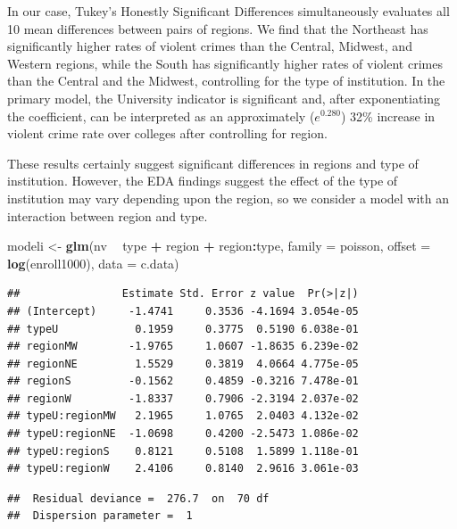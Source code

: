 \documentclass[
]{krantz}
\newenvironment{Shaded}{\begin{snugshade}}{\end{snugshade}}
\newcommand{\DataTypeTok}[1]{\textcolor[rgb]{0.27,0.27,0.27}{#1}}
\newcommand{\KeywordTok}[1]{\textcolor[rgb]{0.27,0.27,0.27}{\textbf{#1}}}
\newcommand{\NormalTok}[1]{#1}
\newcommand{\OperatorTok}[1]{\textcolor[rgb]{0.43,0.43,0.43}{\textbf{#1}}}
\newcommand{\StringTok}[1]{\textcolor[rgb]{0.5,0.5,0.5}{#1}}
\begin{document}
In our case, Tukey's Honestly Significant Differences simultaneously evaluates all 10 mean differences between pairs of regions. We find that the Northeast has significantly higher rates of violent crimes than the Central, Midwest, and Western regions, while the South has significantly higher rates of violent crimes than the Central and the Midwest, controlling for the type of institution. In the primary model, the University indicator is significant and, after exponentiating the coefficient, can be interpreted as an approximately (\(e^{0.280}\)) 32\% increase in violent crime rate over colleges after controlling for region.

These results certainly suggest significant differences in regions and type of institution. However, the EDA findings suggest the effect of the type of institution may vary depending upon the region, so we consider a model with an interaction between region and type.

\begin{Shaded}
\begin{Highlighting}[]
\NormalTok{modeli <-}\StringTok{ }\KeywordTok{glm}\NormalTok{(nv }\OperatorTok{~}\StringTok{ }\NormalTok{type }\OperatorTok{+}\StringTok{ }\NormalTok{region }\OperatorTok{+}\StringTok{ }\NormalTok{region}\OperatorTok{:}\NormalTok{type, }
              \DataTypeTok{family =}\NormalTok{ poisson,}
              \DataTypeTok{offset =} \KeywordTok{log}\NormalTok{(enroll1000), }\DataTypeTok{data =}\NormalTok{ c.data)}
\end{Highlighting}
\end{Shaded}

\begin{verbatim}
##                Estimate Std. Error z value  Pr(>|z|)
## (Intercept)     -1.4741     0.3536 -4.1694 3.054e-05
## typeU            0.1959     0.3775  0.5190 6.038e-01
## regionMW        -1.9765     1.0607 -1.8635 6.239e-02
## regionNE         1.5529     0.3819  4.0664 4.775e-05
## regionS         -0.1562     0.4859 -0.3216 7.478e-01
## regionW         -1.8337     0.7906 -2.3194 2.037e-02
## typeU:regionMW   2.1965     1.0765  2.0403 4.132e-02
## typeU:regionNE  -1.0698     0.4200 -2.5473 1.086e-02
## typeU:regionS    0.8121     0.5108  1.5899 1.118e-01
## typeU:regionW    2.4106     0.8140  2.9616 3.061e-03
\end{verbatim}

\begin{verbatim}
##  Residual deviance =  276.7  on  70 df 
##  Dispersion parameter =  1
\end{verbatim}
\end{document}
